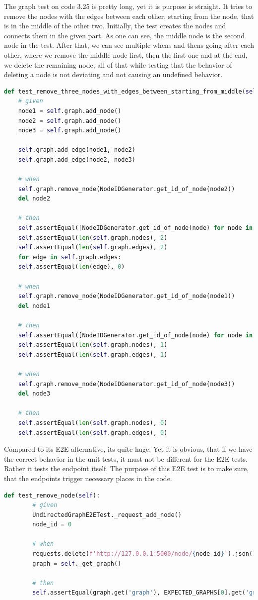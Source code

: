 The graph test on code 3.25 is pretty long, yet it is purpose is straight. It tries to remove the nodes with the edges between each other, starting from the node, that is in the middle of the other two. 
Initially, the test creates the nodes and connects them in the given part. As one can see, the middle node is the second node in the test. After that, we can see multiple whens and thens going after each other, where we remove the middle node first, then the first one and at the end, we delete the remaining node, all of that while testing that the behavior of deleting a node is not deviating and not causing an undefined behavior.
    
\begin{lstlisting}[language={python}]
	def test_remove_three_nodes_with_edges_between_starting_from_middle(self):
	# given
	node1 = self.graph.add_node()
	node2 = self.graph.add_node()
	node3 = self.graph.add_node()
	
	self.graph.add_edge(node1, node2)
	self.graph.add_edge(node2, node3)
	
	# when
	self.graph.remove_node(NodeIDGenerator.get_id_of_node(node2))
	del node2
	
	# then
	self.assertEqual([NodeIDGenerator.get_id_of_node(node) for node in self.graph.nodes], [0, 1])
	self.assertEqual(len(self.graph.nodes), 2)
	self.assertEqual(len(self.graph.edges), 2)
	for edge in self.graph.edges:
	self.assertEqual(len(edge), 0)
	
	# when
	self.graph.remove_node(NodeIDGenerator.get_id_of_node(node1))
	del node1
	
	# then
	self.assertEqual([NodeIDGenerator.get_id_of_node(node) for node in self.graph.nodes], [0])
	self.assertEqual(len(self.graph.nodes), 1)
	self.assertEqual(len(self.graph.edges), 1)
	
	# when
	self.graph.remove_node(NodeIDGenerator.get_id_of_node(node3))
	del node3
	
	# then
	self.assertEqual(len(self.graph.nodes), 0)
	self.assertEqual(len(self.graph.edges), 0)
\end{lstlisting}

Compared to its E2E alternative, its quite huge. Yet it is obvious, that if we have the correct behavior in the unit tests, it must not be different for the E2E tests. Rather it tests the endpoint itself. The purpose of this E2E test is to make sure, that the endpoints trigger necessary places in the code.

\begin{lstlisting}[language={python}]
 	def test_remove_node(self):
		# given
		UndirectedGraphE2ETest._request_add_node()
		node_id = 0
		
		# when
		requests.delete(f'http://127.0.0.1:5000/node/{node_id}').json()
		graph = self._get_graph()
		
		# then
		self.assertEqual(graph.get('graph'), EXPECTED_GRAPHS[0].get('graph'))
\end{lstlisting}
    
